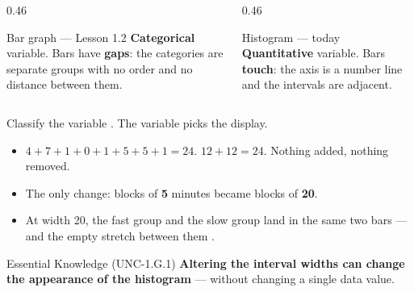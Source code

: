 \documentclass[aspectratio=169, 11pt]{beamer}
\begin{document}
\begin{frame}[t, plain]
  \vspace{10pt}
  \begin{columns}[t]
    \begin{column}{0.46\textwidth}
      \begin{block}{Bar graph --- Lesson 1.2}
        \textbf{Categorical} variable. Bars have \textbf{gaps}: the categories are separate
        groups with no order and no distance between them.
      \end{block}
    \end{column}
    \begin{column}{0.46\textwidth}
      \begin{block}{Histogram --- today}
        \textbf{Quantitative} variable. Bars \textbf{touch}: the axis is a number line and the
        intervals are adjacent.
      \end{block}
    \end{column}
  \end{columns}
  \vspace{14pt}
  \begin{center}
    {\large Classify the variable . The variable picks the display.}
  \end{center}
\end{frame}

\begin{frame}[t, plain]
  \vspace{6pt}
  \begin{itemize}\setlength{\itemsep}{8pt}
    \item $4+7+1+0+1+5+5+1 = 24$. \quad $12 + 12 = 24$. Nothing added, nothing removed.
    \item The only change: blocks of \textbf{5} minutes became blocks of \textbf{20}.
    \item At width 20, the fast group and the slow group land in the same two bars --- and the
          empty stretch between them .
  \end{itemize}
  \vspace{10pt}
  \begin{block}{Essential Knowledge (UNC-1.G.1)}
    \textbf{Altering the interval widths can change the appearance of the histogram} ---
    without changing a single data value.
  \end{block}
\end{frame}
\end{document}
